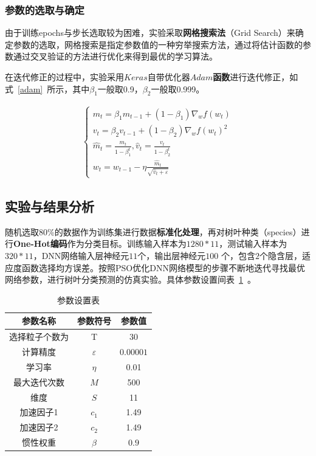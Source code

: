 \documentclass{whutmod}
\begin{document}
	\subsubsection{参数的选取与确定}
	由于训练epochs与步长选取较为困难，实验采取\textbf{网格搜索法}（Grid Search）来确定参数的选取，网格搜索是指定参数值的一种穷举搜索方法，通过将估计函数的参数通过交叉验证的方法进行优化来得到最优的学习算法。
	
	在迭代修正的过程中，实验采用$Keras$自带优化器\textbf{$Adam$函数}进行迭代修正，如式~\ref{adam}~所示，其中$\beta_{1}$一般取0.9，$\beta_{2}$一般取0.999。
	
	\begin{gather*}\label{adam}
	\left\{\begin{array}{l}{m_{t}=\beta_{1} m_{t-1}+\left(1-\beta_{1}\right) \nabla_{w} f\left(w_{t}\right)} \\ {v_{t}=\beta_{2} v_{t-1}+\left(1-\beta_{2}\right) \nabla_{w} f\left(w_{t}\right)^{2}} \\ {\widehat{m}_{t}=\frac{m_{t}}{1-\beta_{1}^{t}}, \hat{v}_{t}=\frac{v_{t}}{1-\beta_{2}^{t}}} \\ {w_{t}=w_{t-1}-\eta \frac{\widehat{m}_{t}}{\sqrt{\hat{v}_{t}+\varepsilon}}}\end{array}\right.
	\end{gather*}


	\subsection{实验与结果分析}
	随机选取80\%的数据作为训练集进行数据\textbf{标准化处理}，再对树叶种类（species）进行\textbf{One-Hot编码}作为分类目标。训练输入样本为$1280*11$，测试输入样本为$320*11$，DNN网络输入层神经元$11$个，输出层神经元$100$ 个，包含$2$个隐含层，适应度函数选择均方误差。按照PSO优化DNN网络模型的步骤不断地迭代寻找最优网络参数，进行树叶分类预测的仿真实验。具体参数设置间表~\ref{canshu}~。
			\begin{table}[H]
		\centering		\caption{参数设置表}\label{canshu}
		\begin{tabular}{ccc}
			\toprule[2pt]
			\multicolumn{1}{m{4cm}}{\centering 参数名称}
			& \multicolumn{1}{m{3cm}}{\centering 参数符号}
			&\multicolumn{1}{m{3cm}}{\centering 参数值}
			\\
			\midrule[1pt]
			选择粒子个数为	 &  T &$30$ \\ 
			计算精度	 &  $\varepsilon$&$0.00001$  \\ 
			学习率	 &  $\eta $ &0.01 \\ 
			最大迭代次数	 &  $M$ &500\\ 
						维度	 &  $S$ &11 \\ 
									加速因子1	 &  $c_{1}$ &1.49\\ 
												加速因子2	 &  $c_{2}$ &1.49 \\ 
			惯性权重	 &  $\beta $ &$0.9$ \\ 
			\bottomrule[2pt]	
		\end{tabular}

	\end{table}
	
\end{document}
